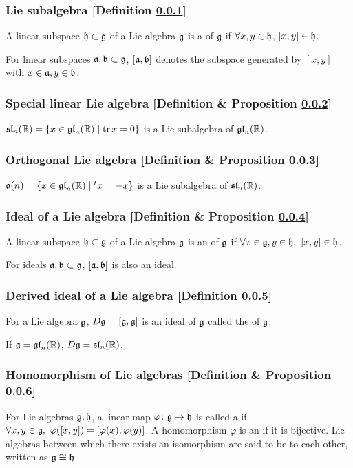 \subsubsection{Lie subalgebra [Definition \ref{lie-subalgebra}]}\label{lie-subalgebra}
A linear subspace $\mathfrak{h} \subset \mathfrak{g}$ of a Lie algebra $\mathfrak{g}$ is a  of $\mathfrak{g}$ if $\forall x, y \in \mathfrak{h}$, $[x,y] \in \mathfrak{h}$.

For linear subspaces $\mathfrak{a}, \mathfrak{b} \subset \mathfrak{g}$, $[\mathfrak{a}, \mathfrak{b}]$ denotes the subspace generated by $[x,y]$ with $x \in \mathfrak{a}, y \in \mathfrak{b}$.

\subsubsection{Special linear Lie algebra [Definition \& Proposition \ref{special-linear-lie-algebra}]}\label{special-linear-lie-algebra}
$\mathfrak{sl}_n(\mathbb{R}) = \{ x \in \mathfrak{gl}_n(\mathbb{R}) \mid \operatorname{tr} x = 0 \} $ is a Lie subalgebra of $\mathfrak{gl}_n(\mathbb{R})$.

\subsubsection{Orthogonal Lie algebra [Definition \& Proposition \ref{orthogonal-lie-algebra}]}\label{orthogonal-lie-algebra}
$\mathfrak{o}(n) = \{ x \in \mathfrak{gl}_n(\mathbb{R}) \mid {}^tx = -x \}$ is a Lie subalgebra of $\mathfrak{sl}_n(\mathbb{R})$.

\subsubsection{Ideal of a Lie algebra [Definition \& Proposition \ref{ideal-of-a-lie-algebra}]}\label{ideal-of-a-lie-algebra}
A linear subspace $\mathfrak{h} \subset \mathfrak{g}$ of a Lie algebra $\mathfrak{g}$ is an  of $\mathfrak{g}$ if $\forall x \in \mathfrak{g}, y \in \mathfrak{h},\ [x,y] \in \mathfrak{h}$.

For ideals $\mathfrak{a}, \mathfrak{b} \subset \mathfrak{g}$, $[\mathfrak{a}, \mathfrak{b}]$ is also an ideal.

\subsubsection{Derived ideal of a Lie algebra [Definition \ref{derived-ideal-of-a-lie-algebra}]}\label{derived-ideal-of-a-lie-algebra}
For a Lie algebra $\mathfrak{g}$, $D\mathfrak{g} = [\mathfrak{g}, \mathfrak{g}]$ is an ideal of $\mathfrak{g}$ called the  of $\mathfrak{g}$.

If $\mathfrak{g} = \mathfrak{gl}_n(\mathbb{R})$, $D\mathfrak{g} = \mathfrak{sl}_n(\mathbb{R})$.

\subsubsection{Homomorphism of Lie algebras [Definition \& Proposition \ref{homomorphism-of-lie-algebras}]}\label{homomorphism-of-lie-algebras}
For Lie algebras $\mathfrak{g}, \mathfrak{h}$, a linear map $\varphi \colon \mathfrak{g} \to \mathfrak{h}$ is called a  if $\forall x, y \in \mathfrak{g},\ \varphi([x,y]) = [\varphi(x), \varphi(y)]$. A homomorphism $\varphi$ is an  if it is bijective. Lie algebras between which there exists an isomorphism are said to be  to each other, written as $\mathfrak{g} \cong \mathfrak{h}$.

